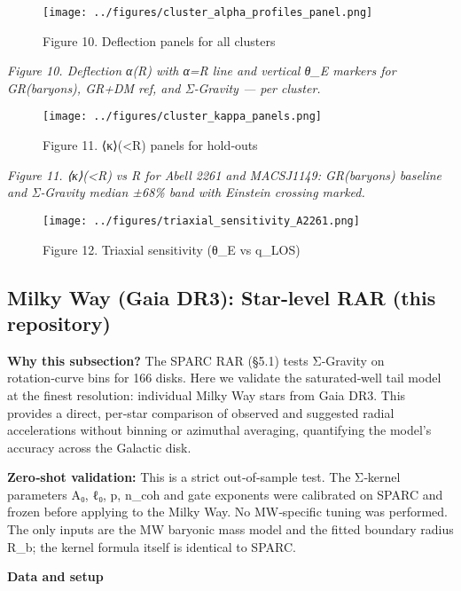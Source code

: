 \documentclass[11pt,a4paper]{article}
\begin{document}
\begin{figure}[h]
\centering
\texttt{[image: ../figures/cluster\_alpha\_profiles\_panel.png]}
\caption{Figure 10. Deflection panels for all clusters}
\end{figure}


\textit{Figure 10. Deflection α(R) with α=R line and vertical θ\_E markers for GR(baryons), GR+DM ref, and Σ‑Gravity — per cluster.}


\begin{figure}[h]
\centering
\texttt{[image: ../figures/cluster\_kappa\_panels.png]}
\caption{Figure 11. ⟨κ⟩(<R) panels for hold‑outs}
\end{figure}


\textit{Figure 11. ⟨κ⟩(<R) vs R for Abell 2261 and MACSJ1149: GR(baryons) baseline and Σ‑Gravity median ±68\% band with Einstein crossing marked.}


\begin{figure}[h]
\centering
\texttt{[image: ../figures/triaxial\_sensitivity\_A2261.png]}
\caption{Figure 12. Triaxial sensitivity (θ_E vs q_LOS)}
\end{figure}


\subsection{Milky Way (Gaia DR3): Star‑level RAR (this repository)}


\textbf{Why this subsection?} The SPARC RAR (§5.1) tests Σ‑Gravity on rotation‑curve bins for 166 disks. Here we validate the saturated‑well tail model at the finest resolution: individual Milky Way stars from Gaia DR3. This provides a direct, per‑star comparison of observed and suggested radial accelerations without binning or azimuthal averaging, quantifying the model's accuracy across the Galactic disk.


\textbf{Zero‑shot validation:} This is a strict out‑of‑sample test. The Σ‑kernel parameters {A₀, ℓ₀, p, n\_coh} and gate exponents were calibrated on SPARC and frozen before applying to the Milky Way. No MW‑specific tuning was performed. The only inputs are the MW baryonic mass model and the fitted boundary radius R\_b; the kernel formula itself is identical to SPARC.


\textbf{Data and setup}
\end{document}
